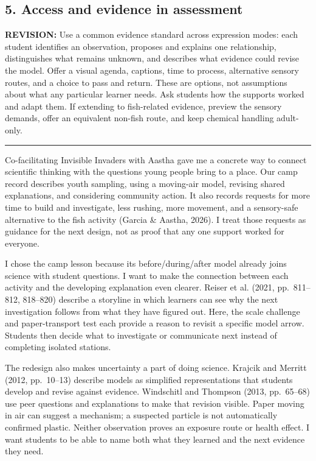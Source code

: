 \documentclass[11pt]{article}
\newcommand{\secx}[1]{\par\Needspace{5\baselineskip}\addvspace{0.10in}{\Large\bfseries\color{PrimaryRed}#1}\par\color{DeepNavy}\hrule\color{black}\vspace{0.08in}}
\newcommand{\revision}[1]{{\color{Addition}\textbf{REVISION:} #1}}
\begin{document}
\subsection*{5. Access and evidence in assessment}
\revision{Use a common evidence standard across expression modes: each student identifies an observation, proposes and explains one relationship, distinguishes what remains unknown, and describes what evidence could revise the model. Offer a visual agenda, captions, time to process, alternative sensory routes, and a choice to pass and return. These are options, not assumptions about what any particular learner needs. Ask students how the supports worked and adapt them. If extending to fish-related evidence, preview the sensory demands, offer an equivalent non-fish route, and keep chemical handling adult-only.}

\newpage
\secx{Reflective Justification}
Co-facilitating Invisible Invaders with Aastha gave me a concrete way to connect scientific thinking with the questions young people bring to a place. Our camp record describes youth sampling, using a moving-air model, revising shared explanations, and considering community action. It also records requests for more time to build and investigate, less rushing, more movement, and a sensory-safe alternative to the fish activity (Garcia \& Aastha, 2026). I treat those requests as guidance for the next design, not as proof that any one support worked for everyone.

I chose the camp lesson because its before/during/after model already joins science with student questions. I want to make the connection between each activity and the developing explanation even clearer. Reiser et al. (2021, pp.~811--812, 818--820) describe a storyline in which learners can see why the next investigation follows from what they have figured out. Here, the scale challenge and paper-transport test each provide a reason to revisit a specific model arrow. Students then decide what to investigate or communicate next instead of completing isolated stations.

The redesign also makes uncertainty a part of doing science. Krajcik and Merritt (2012, pp.~10--13) describe models as simplified representations that students develop and revise against evidence. Windschitl and Thompson (2013, pp.~65--68) use peer questions and explanations to make that revision visible. Paper moving in air can suggest a mechanism; a suspected particle is not automatically confirmed plastic. Neither observation proves an exposure route or health effect. I want students to be able to name both what they learned and the next evidence they need.
\end{document}
